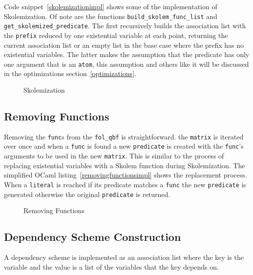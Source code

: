 Code snippet~\ref{skolemizationimpl} shows some of the implementation of Skolemization. Of note are the functions \texttt{build\_skolem\_func\_list} and \texttt{get\_skolemized\_predicate}. The first recursively builds the association list with the \texttt{prefix} reduced by one existential variable at each point, returning the current association list or an empty list in the base case where the prefix has no existential variables. The latter makes the assumption that the predicate has only one argument that is an \texttt{atom}, this assumption and others like it will be discussed in the optimizations section~\ref{optimizations}.

\begin{figure}[H]
\caption{Skolemization}
\begin{CenteredBox}

\end{CenteredBox}
\end{figure}

\subsection{Removing Functions}
Removing the \texttt{func}s from the \texttt{fol\_qbf} is straightforward. the \texttt{matrix} is iterated over once and when a \texttt{func} is found a new \texttt{predicate} is created with the \texttt{func}'s arguments to be used in the new \texttt{matrix}. This is similar to the process of replacing existential variables with a Skolem function during Skolemization. The simplified OCaml listing~\ref{removingfunctionsimpl} shows the replacement process. When a \texttt{literal} is reached if its predicate matches a \texttt{func} the new \texttt{predicate} is generated otherwise the original \texttt{predicate} is returned.

\begin{figure}[H]
\caption{Removing Functions}
\begin{CenteredBox}

\end{CenteredBox}
\end{figure}

\subsection{Dependency Scheme Construction} \label{devdepscheme}
A dependency scheme is implemented as an association list where the key is the variable and the value is a list of the variables that the key depends on.

